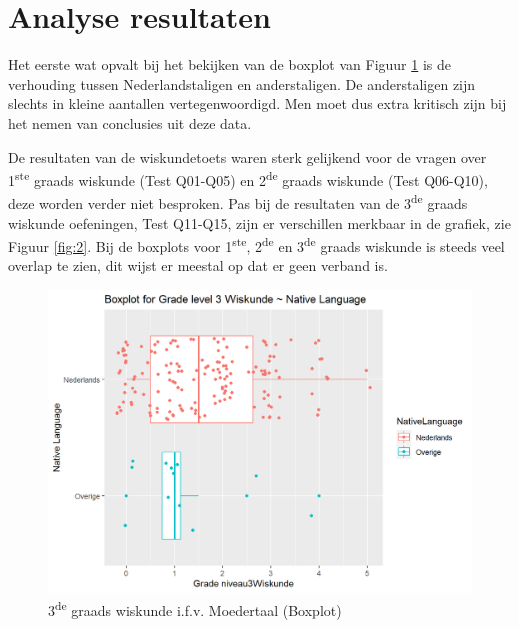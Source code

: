 \documentclass{hogent-article}
\begin{document}
\section{Analyse resultaten}\label{sec:analyse-resultaten}

Het eerste wat opvalt bij het bekijken van de boxplot van Figuur \ref{fig:1} is de verhouding tussen Nederlandstaligen en anderstaligen. De anderstaligen zijn slechts in kleine aantallen vertegenwoordigd. Men moet dus extra kritisch zijn bij het nemen van conclusies uit deze data.

De resultaten van de wiskundetoets waren sterk gelijkend voor de vragen over 1\textsuperscript{ste} graads wiskunde (Test Q01-Q05) en 2\textsuperscript{de} graads wiskunde (Test Q06-Q10), deze worden verder niet besproken. Pas bij de resultaten van de 3\textsuperscript{de} graads wiskunde oefeningen, Test Q11-Q15, zijn er verschillen merkbaar in de grafiek, zie Figuur \ref{fig:2}. Bij de boxplots voor 1\textsuperscript{ste}, 2\textsuperscript{de} en 3\textsuperscript{de} graads wiskunde is steeds veel overlap te zien, dit wijst er meestal op dat er geen verband is.

\begin{figure}
 \includegraphics[width=\linewidth]{Boxplot-Niveau3Wiskunde-NativeLanguage.png}
 \caption{\label{fig:1} 3\textsuperscript{de} graads wiskunde i.f.v. Moedertaal (Boxplot)}
\end{figure}
\end{document}
